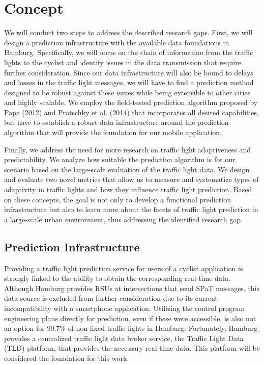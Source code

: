 \section{Concept}\label{sec:signal-prediction}

We will conduct two steps to address the described research gaps. First, we will design a prediction infrastructure with the available data foundations in Hamburg. Specifically, we will focus on the chain of information from the traffic lights to the cyclist and identify issues in the data transmission that require further consideration. Since our data infrastructure will also be bound to delays and losses in the traffic light messages, we will have to find a prediction method designed to be robust against these issues while being extensible to other cities and highly scalable. We employ the field-tested prediction algorithm proposed by Pape (2012) \cite{pape_untersuchung_2012} and Protschky et al. (2014) \cite{protschky_extensive_2014, protschky_adaptive_2014} that incorporates all desired capabilities, but have to establish a robust data infrastructure around the prediction algorithm that will provide the foundation for our mobile application.

Finally, we address the need for more research on traffic light adaptiveness and predictability. We analyze how suitable the prediction algorithm is for our scenario based on the large-scale evaluation of the traffic light data. We design and evaluate two novel metrics that allow us to measure and systematize types of adaptivity in traffic lights and how they influence traffic light prediction. Based on these concepts, the goal is not only to develop a functional prediction infrastructure but also to learn more about the facets of traffic light prediction in a large-scale urban environment, thus addressing the identified research gap.

\subsection{Prediction Infrastructure}

Providing a traffic light prediction service for users of a cyclist application is strongly linked to the ability to obtain the corresponding real-time data. Although Hamburg provides RSUs at intersections that send SPaT messages, this data source is excluded from further consideration due to its current incompatibility with a smartphone application. Utilizing the control program engineering plans directly for prediction, even if these were accessible, is also not an option for 90.7\% of non-fixed traffic lights in Hamburg. Fortunately, Hamburg provides a centralized traffic light data broker service, the Traffic Light Data (TLD) platform, that provides the necessary real-time data. This platform will be considered the foundation for this work.


